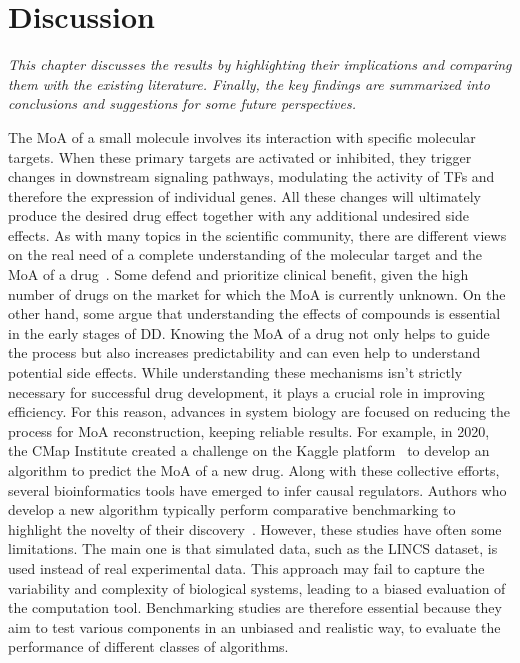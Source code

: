 ﻿%

%


\chapter{Discussion}
\label{cha:discussion}


\textit{This chapter discusses the results by highlighting their implications and comparing them with the existing literature. Finally, the key findings are summarized into conclusions and suggestions for some future perspectives.}

The \gls{MoA} of a small molecule involves its interaction with specific molecular targets. When these primary targets are activated or inhibited, they trigger changes in downstream signaling pathways, modulating the activity of \gls{TF}s and therefore the expression of individual genes. 
All these changes will ultimately produce the desired drug effect together with any additional undesired side effects. 
As with many topics in the scientific community, there are different views on the real need of a complete understanding of the molecular target and the \gls{MoA} of a drug~\cite{RN112}. 
Some defend and prioritize clinical benefit, given the high number of drugs on the market for which the \gls{MoA} is currently unknown. 
On the other hand, some argue that understanding the effects of compounds is essential in the early stages of \gls{DD}. 
Knowing the \gls{MoA} of a drug not only helps to guide the process but also increases predictability and can even help to understand potential side effects. 
While understanding these mechanisms isn't strictly necessary for successful drug development, it plays a crucial role in improving efficiency. 
For this reason, advances in system biology are focused on reducing the process for \gls{MoA} reconstruction, keeping reliable results. 
For example, in 2020, the \gls{CMap} Institute created a challenge on the Kaggle platform~\cite{RN162} to develop an algorithm to predict the \gls{MoA} of a new drug. 
Along with these collective efforts, several bioinformatics tools have emerged to infer causal regulators. 
Authors who develop a new algorithm typically perform comparative benchmarking to highlight the novelty of their discovery~\cite{RN109}. 
However, these studies have often some limitations. The main one is that simulated data, such as the \gls{LINCS} dataset, is used instead of real experimental data. 
This approach may fail to capture the variability and complexity of biological systems, leading to a biased evaluation of the computation tool. 
Benchmarking studies are therefore essential because they aim to test various components in an unbiased and realistic way, to evaluate the performance of different classes of algorithms. 

